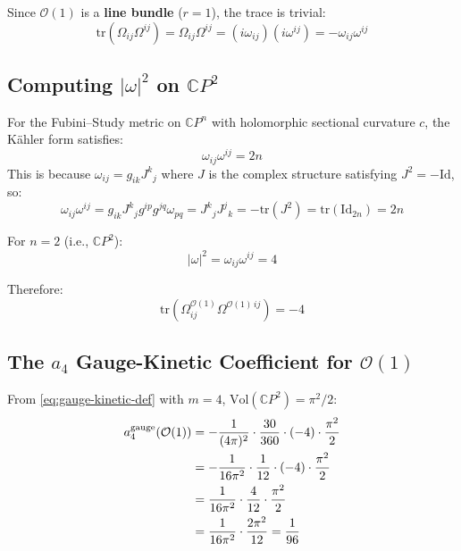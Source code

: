\documentclass[12pt,a4paper]{article}
\theoremstyle{definition}
\begin{document}
Since $\mathcal{O}(1)$ is a \textbf{line bundle} ($r = 1$), the trace
is trivial:
\begin{equation}
\mathrm{tr}(\Omega_{ij}\Omega^{ij})
= \Omega_{ij}\Omega^{ij}
= (i\omega_{ij})(i\omega^{ij})
= -\omega_{ij}\omega^{ij}
\end{equation}

\subsection{Computing $|\omega|^2$ on $\mathbb{C}P^2$}

For the Fubini--Study metric on $\mathbb{C}P^n$ with holomorphic
sectional curvature $c$, the K\"ahler form satisfies:
\begin{equation}
\omega_{ij}\omega^{ij} = 2n
\end{equation}
This is because $\omega_{ij} = g_{ik}J^k{}_j$ where $J$ is the complex
structure satisfying $J^2 = -\mathrm{Id}$, so:
\begin{equation}
\omega_{ij}\omega^{ij} = g_{ik}J^k{}_j g^{ip}g^{jq}\omega_{pq}
= J^k{}_j J^j{}_k = -\mathrm{tr}(J^2) = \mathrm{tr}(\mathrm{Id}_{2n})
= 2n
\end{equation}

For $n = 2$ (i.e., $\mathbb{C}P^2$):
\begin{equation}
|\omega|^2 = \omega_{ij}\omega^{ij} = 4
\end{equation}

Therefore:
\begin{equation}
\mathrm{tr}(\Omega^{\mathcal{O}(1)}_{ij}\Omega^{\mathcal{O}(1)\,ij})
= -4
\end{equation}

\subsection{The $a_4$ Gauge-Kinetic Coefficient for $\mathcal{O}(1)$}

From \eqref{eq:gauge-kinetic-def} with $m = 4$,
$\mathrm{Vol}(\mathbb{C}P^2) = \pi^2/2$:
\begin{align}
a_4^{\rm gauge}(\mathcal{O}(1))
&= -\frac{1}{(4\pi)^2}\cdot\frac{30}{360}\cdot(-4)\cdot\frac{\pi^2}{2}
\nonumber\\
&= -\frac{1}{16\pi^2}\cdot\frac{1}{12}\cdot(-4)\cdot\frac{\pi^2}{2}
\nonumber\\
&= \frac{1}{16\pi^2}\cdot\frac{4}{12}\cdot\frac{\pi^2}{2}
\nonumber\\
&= \frac{1}{16\pi^2}\cdot\frac{2\pi^2}{12}
= \frac{1}{96}
\end{align}
\end{document}
